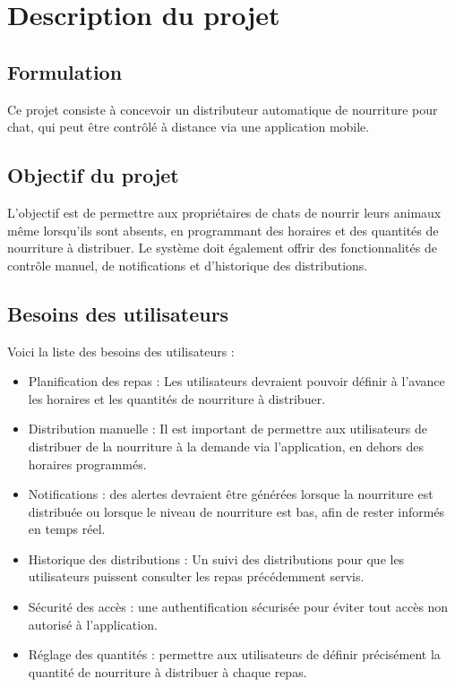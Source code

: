 \chapter*{Description du projet}
\section{Formulation}
Ce projet consiste à concevoir un distributeur automatique de nourriture pour chat, qui peut être contrôlé à distance via une application mobile. 
\section{Objectif du projet}
	L'objectif est de permettre aux propriétaires de chats de nourrir leurs animaux même lorsqu'ils sont absents, en programmant des horaires et des quantités de nourriture à distribuer. Le système doit également offrir des fonctionnalités de contrôle manuel, de notifications et d'historique des distributions.
\section{Besoins des utilisateurs}

Voici la liste des besoins des utilisateurs :

\begin{itemize}
	\item Planification des repas : Les utilisateurs devraient pouvoir définir à l'avance les horaires et les quantités de nourriture à distribuer.
	\item Distribution manuelle : Il est important de permettre aux utilisateurs de distribuer de la nourriture à la demande via l'application, en dehors des horaires programmés.
	\item Notifications : des alertes devraient être générées lorsque la nourriture est distribuée ou lorsque le niveau de nourriture est bas, afin de rester informés en temps réel.
	\item Historique des distributions : Un suivi des distributions pour que les utilisateurs puissent consulter les repas précédemment servis.
	\item Sécurité des accès : une authentification sécurisée pour éviter tout accès non autorisé à l'application.
	\item Réglage des quantités : permettre aux utilisateurs de définir précisément la quantité de nourriture à distribuer à chaque repas.
\end{itemize}
    
